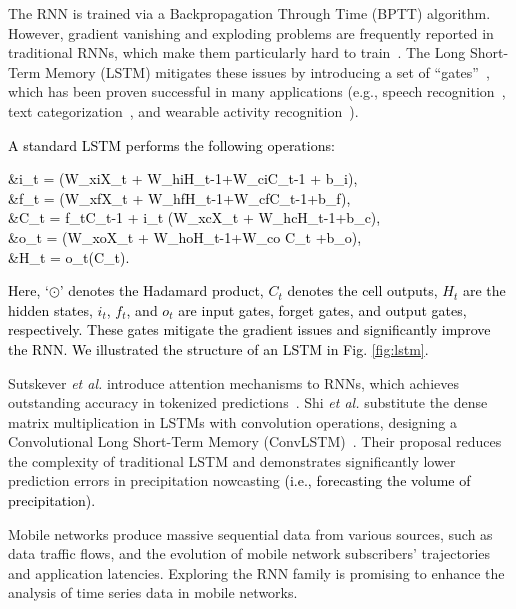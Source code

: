 \documentclass[journal,comsoc,letter]{IEEEtran}
\newcommand{\edit}[1]{\textcolor{black}{#1}}
\begin{document}
The RNN is trained via a Backpropagation Through Time (BPTT) algorithm. However, gradient vanishing and exploding problems are frequently reported in traditional RNNs, which make them particularly hard to train~\cite{bengio1994learning}. The Long Short-Term Memory (LSTM) mitigates these issues by introducing a set of ``gates''~\cite{gers1999learning}, which has been proven successful in many applications (e.g., speech recognition~\cite{graves2013hybrid}, text categorization~\cite{johnson2016supervised}, and wearable activity recognition~\cite{ordonez2016deep}). \edit{A standard LSTM performs the following operations:
\begin{flalign*}
&i_t = \sigma(W_{xi}X_t + W_{hi}H_{t-1}+W_{ci}\odot C_{t-1} + b_i),\\
&f_t = \sigma(W_{xf}X_t + W_{hf}H_{t-1}+W_{cf}\odot C_{t-1}+b_f),\\
&C_t = f_t\odot C_{t-1} + i_t \odot \tanh(W_{xc}X_t + W_{hc}H_{t-1}+b_c),\\
&o_t = \sigma(W_{xo}X_t + W_{ho}H_{t-1}+W_{co} \odot C_t +b_o),\\
&H_t = o_t\odot \tanh(C_t).
\end{flalign*}
Here, `$\odot$' denotes the Hadamard product, $C_t$ denotes the cell outputs,  $H_t$ are the hidden states,  $i_t$,  $f_t$, and  $o_t$ are input gates, forget gates, and output gates, respectively. These gates mitigate the gradient issues and significantly improve the RNN. We illustrated the structure of an LSTM in Fig. \ref{fig:lstm}.}

Sutskever \emph{et al.} introduce attention mechanisms to RNNs, which achieves outstanding accuracy in tokenized predictions~\cite{sutskever2014sequence}. Shi \emph{et al.} substitute the dense matrix multiplication in LSTMs with convolution operations, designing a Convolutional Long Short-Term Memory (ConvLSTM)~\cite{xingjian2015convolutional}. Their proposal reduces the complexity of traditional LSTM and demonstrates significantly lower prediction errors in precipitation \mbox{nowcasting} \edit{(i.e., forecasting the volume of precipitation).}

Mobile networks produce massive sequential data from various sources, such as data traffic flows, and the evolution of mobile network subscribers' trajectories and application latencies. Exploring the RNN family is promising to enhance the analysis of time series data in mobile networks.  
\end{document}
